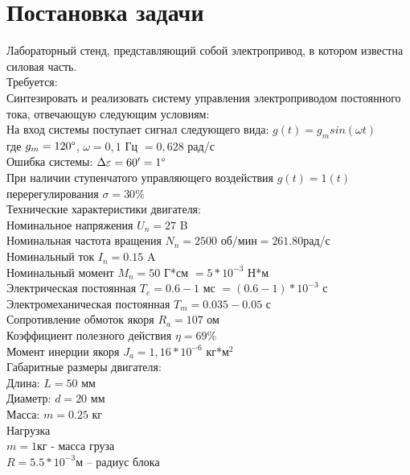 \documentclass[a4paper,12pt]{article}
\begin{document}


\newpage
\tableofcontents
\newpage
\listoffigures
\newpage
\section{Постановка задачи}
Лабораторный стенд, представляющий собой электропривод, в котором известна силовая часть. \\
Требуется:\\
Синтезировать и реализовать систему управления электроприводом постоянного тока, отвечающую следующим условиям:\\
На вход системы поступает сигнал следующего вида: $g(t)=g_m sin(\omega t)$\\
где $g_m =120\degree$, $\omega=0,1$ Гц $= 0,628$ рад/с\\
Ошибка системы: $\Delta \varepsilon=60'=1\degree$\\
При наличии ступенчатого управляющего воздействия $g(t) = 1(t)$ \\
перерегулирования $\sigma = 30\%$\\

Технические характеристики двигателя:\\
Номинальное напряжения $U_n=27 $ B\\
Номинальная частота вращения $N_n=2500 $ об/мин$=261.80$рад/с\\
Номинальный ток $I_n=0.15 $ A\\
Номинальный момент $M_n = 50$ Г*см $= 5*10^{-3}$ Н*м\\
Электрическая постоянная $T_e = 0.6 - 1$ мс $ = (0.6 - 1)*10^{-3} $ с\\
Электромеханическая постоянная $T_m =0.035 - 0.05$ с\\
Сопротивление обмоток якоря $R_{a}=107 $ ом\\
Коэффициент полезного действия $\eta=69 \%$\\
Момент инерции якоря $J_{a} = 1,16* 10^{-6} $ кг*м$^2$\\

Габаритные размеры двигателя:\\
Длина: $L=50 $ мм\\
Диаметр: $d=20$ мм\\
Масса: $m=0.25$ кг\\

Нагрузка\\
$m = 1 $кг - масса груза\\
$R = 5.5*10^{-3} $м – радиус блока \\
\end{document}
